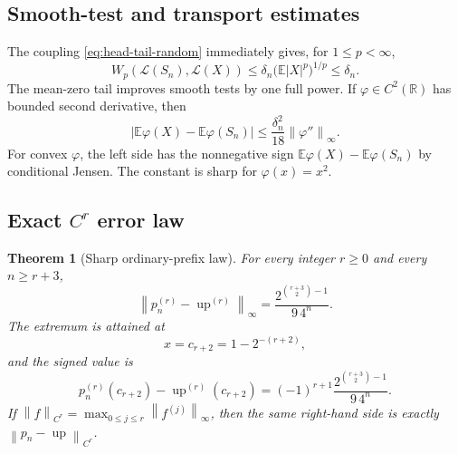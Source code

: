 \documentclass[11pt]{article}
\newtheorem{theorem}{Theorem}[section]
\theoremstyle{definition}
\theoremstyle{remark}
\newcommand{\R}{\mathbb R}
\newcommand{\E}{\mathbb E}
\newcommand{\Up}{\operatorname{up}}
\newcommand{\norm}[1]{\left\lVert #1\right\rVert}
\begin{document}
\subsection{Smooth-test and transport estimates}

The coupling \cref{eq:head-tail-random} immediately gives, for $1\le p<\infty$,
\begin{equation}
 W_p(\mathcal L(S_n),\mathcal L(X))
 \le \delta_n\bigl(\E|X|^p\bigr)^{1/p}\le\delta_n.
 \label{eq:wasserstein-bound}
\end{equation}
The mean-zero tail improves smooth tests by one full power.  If
$\varphi\in C^2(\R)$ has bounded second derivative, then
\begin{equation}
 \left|\E\varphi(X)-\E\varphi(S_n)\right|
 \le\frac{\delta_n^2}{18}\norm{\varphi''}_\infty.
 \label{eq:smooth-test-bound}
\end{equation}
For convex $\varphi$, the left side has the nonnegative sign
$\E\varphi(X)-\E\varphi(S_n)$ by conditional Jensen.  The constant is sharp for
$\varphi(x)=x^2$.

\subsection{Exact $C^r$ error law}

\begin{theorem}[Sharp ordinary-prefix law]
\label{thm:sharp-prefix-law}
For every integer $r\ge0$ and every $n\ge r+3$,
\begin{equation}
 \boxed{
 \norm{p_n^{(r)}-\Up^{(r)}}_\infty
 =\frac{2^{\binom{r+3}{2}-1}}{9\,4^n}.}
 \label{eq:sharp-prefix-law}
\end{equation}
The extremum is attained at
\begin{equation}
 x=c_{r+2}=1-2^{-(r+2)},
 \label{eq:error-extremizer}
\end{equation}
and the signed value is
\begin{equation}
 p_n^{(r)}(c_{r+2})-\Up^{(r)}(c_{r+2})
 =(-1)^{r+1}\frac{2^{\binom{r+3}{2}-1}}{9\,4^n}.
 \label{eq:signed-error-extremizer}
\end{equation}
If
$\norm{f}_{C^r}=\max_{0\le j\le r}\norm{f^{(j)}}_\infty$, then the same right-hand
side is exactly $\norm{p_n-\Up}_{C^r}$.
\end{theorem}
\end{document}

